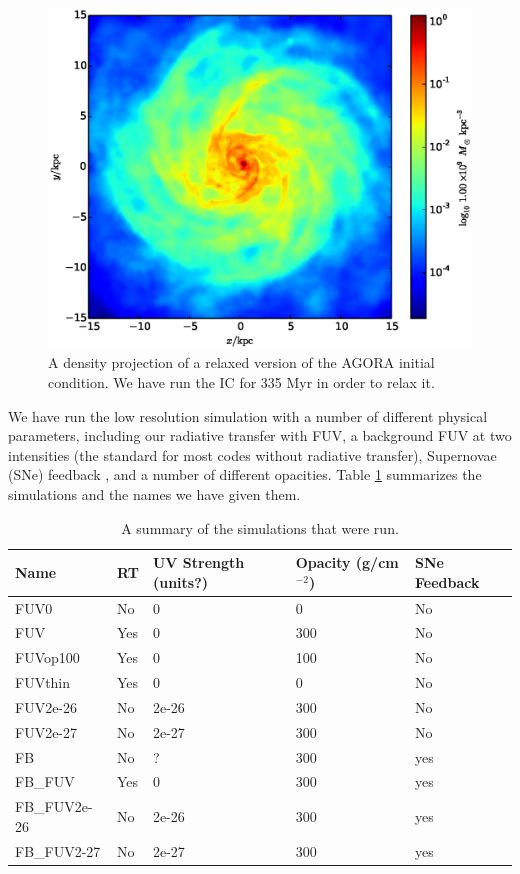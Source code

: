 \begin{figure}
\includegraphics[width=\textwidth]{graphics/AGORAic.eps}
\caption[The AGORA IC]{A density projection of a relaxed version of the AGORA initial condition. We have run the IC for 335 Myr in order to relax it.}
\label{fig:agoraic}
\end{figure}


We have run the low resolution simulation with a number of different physical parameters, including our radiative transfer with FUV, a background FUV at two intensities (the standard for most codes without radiative transfer), Supernovae (SNe) feedback \citep{kellerEt14}, and a number of different opacities. Table \ref{tab:simsummary} summarizes the simulations and the names we have given them.

\begin{table}
\begin{tabular}{lllll}
Name & RT & UV Strength (units?) & Opacity (g/cm$^{-2}$) & SNe Feedback\\ \hline \hline
FUV0 & No & 0 & 0 & No\\
FUV & Yes & 0 & 300 & No\\
FUVop100 & Yes & 0 & 100 & No\\
FUVthin & Yes & 0 & 0 & No\\
FUV2e-26 & No & 2e-26 & 300 & No\\
FUV2e-27 & No & 2e-27 & 300 & No\\
FB & No & ? & 300 & yes\\
FB\_FUV & Yes & 0 & 300 & yes\\
FB\_FUV2e-26 & No & 2e-26 & 300 & yes\\
FB\_FUV2-27 & No & 2e-27 & 300 & yes\\
\hline
\end{tabular}
\caption[Summary of simulations]{A summary of the simulations that were run.}
\label{tab:simsummary}
\end{table}

